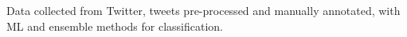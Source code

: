 Data collected from Twitter, tweets pre-processed and manually annotated, with ML and ensemble methods for classification.